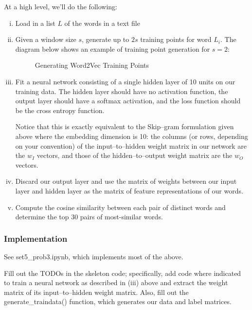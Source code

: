At a high level, we'll do the following:
\begin{enumerate} [(i)]
\item
Load in a list $L$ of the words in a text file

\item
Given a window size $s$, generate up to $2s$ training points for
word $L_i$. The diagram below shows an example of training point generation for $s = 2$:

\begin{figure}[H]
\begin{center}
\caption{Generating Word2Vec Training Points}
\end{center}
\end{figure}


\item
Fit a neural network consisting of a single hidden layer of 10 units on our training data.  The hidden layer should have no activation function, the output layer should have a softmax activation, and the loss function should be the cross entropy function.  

Notice that this is exactly equivalent to the Skip--gram formulation given above where the embedding dimension is 10: the columns (or rows, depending on your convention) of the input--to--hidden weight matrix in our network are the $w_I$ vectors, and those of the hidden--to--output weight matrix are the $w_O$ vectors.

\item
Discard our output layer and use the matrix of weights between our input layer and hidden layer as the matrix of feature representations of our words.

\item
Compute the cosine similarity between each pair of distinct words and determine the top 30 pairs of most-similar words.
\end{enumerate}

\subsubsection{Implementation}

See set5_prob3.ipynb, which implements most of the above.

\problem[10]
Fill out the TODOs in the skeleton code; specifically, add code where indicated to train a neural network as described in (iii) above and extract the weight matrix of its input--to--hidden weight matrix. Also, fill out the generate\_traindata() function, which generates our data and label matrices.


